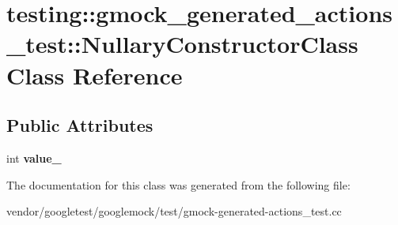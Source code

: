\hypertarget{classtesting_1_1gmock__generated__actions__test_1_1_nullary_constructor_class}{}\section{testing\+:\+:gmock\+\_\+generated\+\_\+actions\+\_\+test\+:\+:Nullary\+Constructor\+Class Class Reference}
\label{classtesting_1_1gmock__generated__actions__test_1_1_nullary_constructor_class}
\subsection*{Public Attributes}
\begin{DoxyCompactItemize}
\item 
\mbox{\label{classtesting_1_1gmock__generated__actions__test_1_1_nullary_constructor_class_aa877ccc5aff335cbf81b8de90abee732}} 
int {\bfseries value\+\_\+}
\end{DoxyCompactItemize}


The documentation for this class was generated from the following file\+:\begin{DoxyCompactItemize}
\item 
vendor/googletest/googlemock/test/gmock-\/generated-\/actions\+\_\+test.\+cc\end{DoxyCompactItemize}
